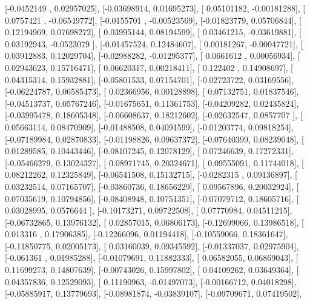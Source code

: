 \documentclass{article}
\begin{document}
       [-0.0452149 ,  0.02957025],
       [-0.03698914,  0.01695273],
       [ 0.05101182, -0.00181288],
       [ 0.0757421 , -0.06549772],
       [-0.0155701 , -0.00523569],
       [-0.01823779,  0.05706844],
       [ 0.12194969,  0.07698272],
       [ 0.03995144,  0.08194599],
       [ 0.03461215, -0.03619881],
       [ 0.03192943, -0.0523079 ],
       [-0.01457524,  0.12484607],
       [ 0.00181267, -0.00047721],
       [ 0.03912883,  0.12029704],
       [-0.02988282, -0.01295377],
       [ 0.0661612 ,  0.00056934],
       [ 0.02943623,  0.15716471],
       [ 0.06620317,  0.00218411],
       [ 0.122402  ,  0.14908697],
       [ 0.04315314,  0.15932881],
       [-0.05801533,  0.07154701],
       [-0.02723722,  0.03169556],
       [-0.06224787,  0.06585473],
       [ 0.02366956,  0.00128898],
       [ 0.07132751,  0.01837546],
       [-0.04513737,  0.05767246],
       [-0.01675651,  0.11361753],
       [-0.04209282,  0.02435824],
       [-0.03995478,  0.18605348],
       [-0.06608637,  0.18212602],
       [-0.02632547,  0.0857707 ],
       [ 0.05663114,  0.08470909],
       [-0.01488508,  0.04091599],
       [-0.01203774,  0.09818254],
       [-0.07189984,  0.02870833],
       [-0.01198826,  0.09637372],
       [-0.07640399,  0.08239048],
       [ 0.01289585,  0.10443446],
       [-0.08107245,  0.12078129],
       [ 0.07246639,  0.17272331],
       [-0.05466279,  0.13024327],
       [ 0.08971745,  0.20324671],
       [ 0.09555091,  0.11744018],
       [ 0.08212262,  0.12325849],
       [-0.06541508,  0.15132715],
       [-0.0282315 ,  0.09136897],
       [ 0.03232514,  0.07165707],
       [-0.03860736,  0.18656229],
       [ 0.09567896,  0.20032924],
       [ 0.07035619,  0.10794856],
       [-0.08408948,  0.10751351],
       [-0.07079712,  0.18605716],
       [ 0.03028995,  0.0576644 ],
       [-0.10173271,  0.09722508],
       [ 0.07770984,  0.04511215],
       [-0.06732865,  0.13976132],
       [ 0.02857015,  0.06806173],
       [-0.12699066,  0.13986518],
       [ 0.013316  ,  0.17906385],
       [-0.12266096,  0.01194418],
       [-0.10559066,  0.18361647],
       [-0.11850775,  0.02005173],
       [ 0.03160039,  0.09345592],
       [-0.01337037,  0.02975904],
       [-0.061361  ,  0.01985288],
       [-0.01079691,  0.11882333],
       [ 0.06582055,  0.06869043],
       [ 0.11699273,  0.14807639],
       [-0.00743026,  0.15997802],
       [ 0.04109262,  0.03649364],
       [ 0.04357836,  0.12529093],
       [ 0.11190963, -0.01497073],
       [-0.00166712,  0.04018298],
       [-0.05885917,  0.13779693],
       [-0.08981874, -0.03839107],
       [-0.09709671,  0.07419502],
\end{document}
